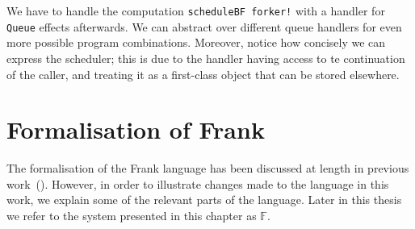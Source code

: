 \documentclass[msc,deptreport,cs]{infthesis} %
\newcommand{\code}[1]{\lstinline{#1}}
\newcommand\purefrank{$\mathbb{F}$}
\begin{document}
We have to handle the computation \code{scheduleBF forker!} with a handler for
\code{Queue} effects afterwards. We can abstract over different queue handlers
for even more possible program combinations. Moreover, notice how concisely we
can express the scheduler; this is due to the handler having access to te
continuation of the caller, and treating it as a first-class object that can be
stored elsewhere.

\chapter{Formalisation of Frank}
\label{chap:formalisation}

The formalisation of the Frank language has been discussed at length in previous
work~(\cite{convent2020doo}). However, in order to illustrate changes made to
the language in this work, we explain some of the relevant parts of the
language. Later in this thesis we refer to the system presented in this chapter as \purefrank.
\end{document}
